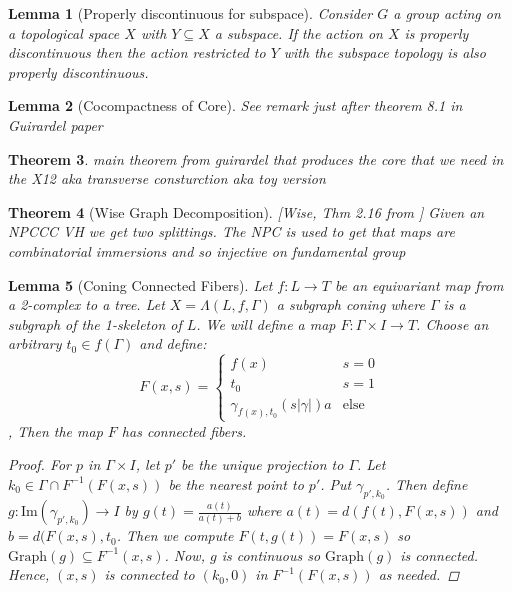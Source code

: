 \documentclass{article}
\theoremstyle{mystyle}
\newtheorem{thm}{Theorem}[section]
\newtheorem{lem}[thm]{Lemma}
\theoremstyle{remark}
\begin{document}
\begin{lem}
    [Properly discontinuous for subspace]
    \label{lem:pdsubspace}
    Consider $G$ a group acting on a topological space $X$ with $Y \subseteq X$ a subspace. If the action on $X$ is properly discontinuous then the action restricted to $Y$ with the subspace topology is also properly discontinuous. 
\end{lem}
\begin{lem}
    [Cocompactness of Core]
    See remark just after theorem 8.1 in Guirardel paper
\end{lem}
\begin{thm}
\label{thm:guirardelcore}
main theorem from guirardel that produces the core that we need in the X12 aka transverse consturction aka toy version
\end{thm}
\begin{thm}[Wise Graph Decomposition]
\label{thm:wisegraph}[Wise, Thm 2.16 from \cite{wisecsc}]
Given an NPCCC VH we get two splittings. The NPC is used to get that maps are combinatorial immersions and so injective on fundamental group
\end{thm}
\begin{lem}
    [Coning Connected Fibers]
    \label{lem:confib} 
    Let $f: L\to T$ be an equivariant map from a 2-complex to a tree. Let $X = \Lambda(L,f,\Gamma)$ a subgraph coning where $\Gamma$ is a subgraph of the 1-skeleton of $L$.
     We will define a map \(F: \Gamma \times I \to T\). Choose an arbitrary \(t_{0} \in f(\Gamma) \) and define: 
    \[ F(x,s) = 
        \begin{cases} 
            f(x)& s=0\\ 
            t_{0} & s=1\\
            \gamma_{f(x),t_{0}} (s | \gamma |)a & \text{else}
        \end{cases}
    \]
,    Then the map $F$ has connected fibers.
    \begin{proof}
        
    
    For \(p\) in \(\Gamma\times I\), let \(p'\) be the unique projection to $\Gamma$. Let \(k_{0} \in \Gamma \cap F^{-1} (F(x,s))\) be the nearest point to \(p'\). Put \(\gamma_{p',k_{0}}\). Then define \(g: \text{Im} (\gamma_{p',k_{0}}) \to I\) by \(g(t) = \frac{a(t)}{a(t)+b}\) where \(a(t) = d(f(t), F(x,s))\) and \(b = d(F(x,s), t_{0}\). Then we compute \(F(t,g(t))=F(x,s)\) so \(\text{Graph}(g) \subseteq F^{-1} (x,s)\). Now, \(g\) is continuous so \(\text{Graph}(g)\) is connected. Hence, \((x,s)\) is connected to \((k_{0} ,0)\) in \(F^{-1} (F(x,s))\) as needed.
    \end{proof}
\end{lem}
\end{document}
